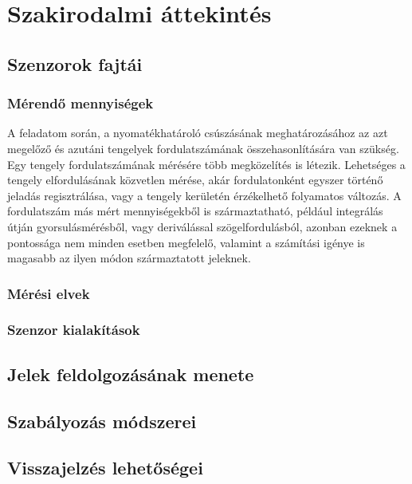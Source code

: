 \chapter{Szakirodalmi áttekintés}
\label{sec:Szakirodalom}
\section{Szenzorok fajtái}

\subsection{Mérendő mennyiségek}

A feladatom során, a nyomatékhatároló csúszásának meghatározásához az azt megelőző és azutáni tengelyek fordulatszámának összehasonlítására van szükség. Egy tengely fordulatszámának mérésére több megközelítés is létezik. Lehetséges a tengely elfordulásának közvetlen mérése, akár fordulatonként egyszer történő jeladás regisztrálása, vagy a tengely kerületén érzékelhető folyamatos változás. A fordulatszám más mért mennyiségekből is származtatható, például integrálás útján gyorsulásmérésből, vagy deriválással szögelfordulásból, azonban ezeknek a pontossága nem minden esetben megfelelő, valamint a számítási igénye is magasabb az ilyen módon származtatott jeleknek.

\subsection{Mérési elvek}

\subsection{Szenzor kialakítások}
\section{Jelek feldolgozásának menete}

\section{Szabályozás módszerei}

\section{Visszajelzés lehetőségei}
